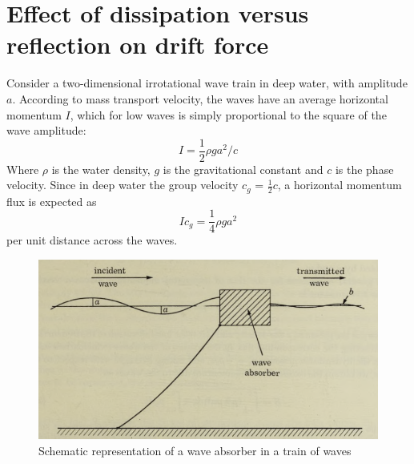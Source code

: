 \chapter{Effect of dissipation versus reflection on drift force}
\label{appendix:reflectionversusdrift}

Consider a two-dimensional irrotational wave train in deep water, with amplitude $a$. According to mass transport velocity, the waves have an average horizontal momentum $I$, which for low waves is simply proportional to the square of the wave amplitude:
\begin{equation}
    I = \frac{1}{2} \rho g a^2/c
\end{equation}
Where $\rho$ is the water density, $g$ is the gravitational constant and $c$ is the phase velocity. Since in deep water the group velocity $c_g$ = $\frac{1}{2}c$, a horizontal momentum flux is expected as
\begin{equation}
    I c_g = \frac{1}{4}\rho g a^2
\end{equation}
per unit distance across the waves. 
\begin{figure}
    \centering
    \includegraphics[width=0.7\linewidth]{figures/Literature_Introduction/waveabsorber_longuethiggins1977.PNG}
    \caption{Schematic representation of a wave absorber in a train of waves \parencite{longuethiggins1977}}
    \label{fig: wavetrainabsorber_longuetHiggins1977}
\end{figure}

